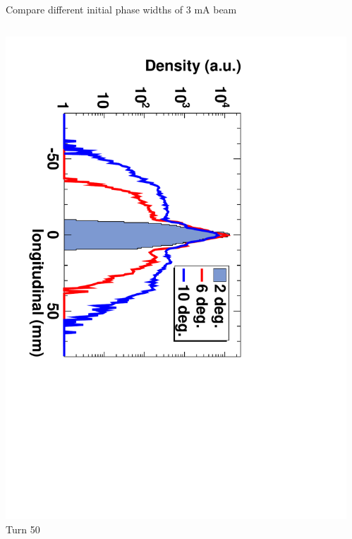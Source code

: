 \documentclass[xcolor=pdftex,table,10pt,yellow,mathserif]{beamer}
\begin{document}
{\begin{block}{Compare different initial phase widths of 3 mA beam}
\begin{columns}
\begin{column}{3.0cm}
      \includegraphics[angle=90,width=\linewidth]{figures/Theta-Turn-50.pdf} \\
      \center Turn 50
    \end{column}
    \begin{column}{3.0cm}

\end{column}
\end{columns}
\end{block}}
\end{document}
